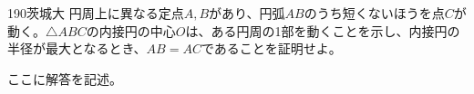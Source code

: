 \begin{prob}{190}{}{茨城大}
 円周上に異なる定点$A, B$があり、円弧$AB$のうち短くないほうを点$C$が動く。$\triangle{ABC}$の内接円の中心$O$は、ある円周の1部を動くことを示し、内接円の半径が最大となるとき、$AB=AC$であることを証明せよ。
\end{prob}

ここに解答を記述。